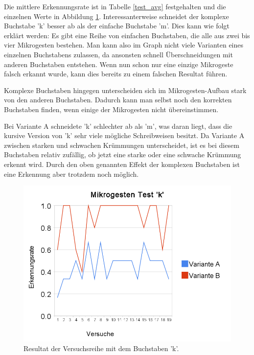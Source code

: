 Die mittlere Erkennungsrate ist in Tabelle \ref{test_avg} festgehalten und die einzelnen Werte in Abbildung \ref{test_k}. Interessanterweise schneidet der komplexe Buchstabe 'k' besser ab als der einfache Buchstabe 'm'. Dies kann wie folgt erklärt werden: Es gibt eine Reihe von einfachen Buchstaben, die alle aus zwei bis vier Mikrogesten bestehen. Man kann also im Graph nicht viele Varianten eines einzelnen Buchstabens zulassen, da ansonsten schnell Überschneidungen mit anderen Buchstaben entstehen. Wenn nun schon nur eine einzige Mikrogeste falsch erkannt wurde, kann dies bereits zu einem falschen Resultat führen.

Komplexe Buchstaben hingegen unterscheiden sich im Mikrogesten-Aufbau stark von den anderen Buchstaben. Dadurch kann man selbst noch den korrekten Buchstaben finden, wenn einige der Mikrogesten nicht übereinstimmen.

Bei Variante A schneidete 'k' schlechter ab als 'm', was daran liegt, dass die kursive Version von 'k' sehr viele mögliche Schreibweisen besitzt. Da Variante A zwischen starken und schwachen Krümmungen unterscheidet, ist es bei diesem Buchstaben relativ  zufällig, ob jetzt eine starke oder eine schwache Krümmung erkennt wird. Durch den oben genannten Effekt der komplexen Buchstaben ist eine Erkennung aber trotzdem noch möglich.

\begin{figure}[h!]
  \centering
    \includegraphics[scale=0.4]{./img/mikrogesten_test_k.png}
  \caption{Resultat der Versuchsreihe mit dem Buchstaben 'k'.  }
  \label{test_k}
\end{figure}

